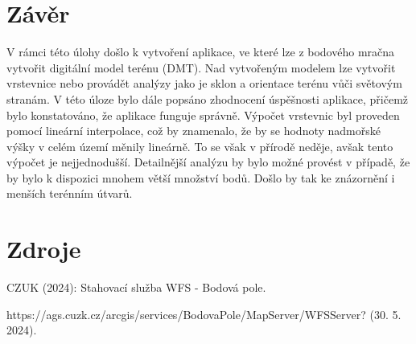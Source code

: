 \documentclass{article}
\begin{document}
\begin{spacing}{1.5}
\section{Závěr}
V rámci této úlohy došlo k vytvoření aplikace, ve které lze z bodového mračna vytvořit digitální model terénu (DMT). Nad vytvořeným modelem lze vytvořit vrstevnice nebo provádět analýzy jako je sklon a orientace terénu vůči světovým stranám. V této úloze bylo dále popsáno zhodnocení úspěšnosti aplikace, přičemž bylo konstatováno, že aplikace funguje správně. Výpočet vrstevnic byl proveden pomocí lineární interpolace, což by znamenalo, že by se hodnoty nadmořské výšky v celém území měnily lineárně. To se však v přírodě neděje, avšak tento výpočet je nejjednodušší. Detailnější analýzu by bylo možné provést v případě, že by bylo k dispozici mnohem větší množství bodů. Došlo by tak ke znázornění i menších terénním útvarů. 

\section{Zdroje}
CZUK (2024): Stahovací služba WFS - Bodová pole. 

\noindent https://ags.cuzk.cz/arcgis/services/BodovaPole/MapServer/WFSServer? (30. 5. 2024).

\end{spacing}
\end{document}
